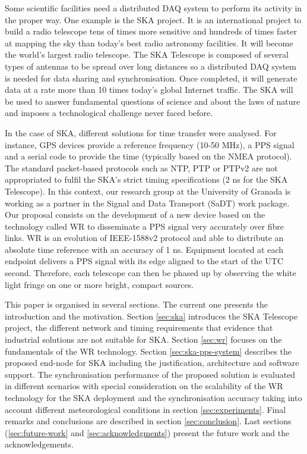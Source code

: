 Some scientific facilities need a distributed DAQ system to perform its activity in the proper way. One example is the SKA \cite{ska:project_website} project. It is an international project to build a radio telescope tens of times more sensitive and hundreds of times faster at mapping the sky than today's best radio astronomy facilities. It will become the world's largest radio telescope. The SKA Telescope is composed of several types of antennas to be spread over long distances so a distributed DAQ system is needed for data sharing and synchronisation. Once completed, it will generate data at a rate more than 10 times today’s global Internet traffic. The SKA will be used to answer fundamental questions of science and about the laws of nature and imposes a technological challenge never faced before.

In the case of SKA, different solutions for time transfer were analysed. For instance, GPS devices provide a reference frequency (10-50 MHz), a PPS signal and a serial code to provide the time (typically based on the NMEA protocol). The standard packet-based protocols such as NTP, PTP or PTPv2 are not appropriated to fulfil the SKA's strict timing specifications (2 ns for the SKA Telescope).
In this context, our research group at the University of Granada is working as a partner in the Signal and Data Transport (SaDT) \cite{ska:sadt_website} work package. Our proposal consists on the development of a new device based on the technology called WR \cite{ohwr:wr_wiki} to disseminate a PPS signal very accurately over fibre links. WR is an evolution of IEEE-1588v2 protocol and able to distribute an absolute time reference with an accuracy of 1 ns. Equipment located at each endpoint delivers a PPS signal with its edge aligned to the start of the UTC second. Therefore, each telescope can then be phased up by observing the white light fringe on one or more bright, compact sources.

This paper is organised in several sections. The current one 
presents the introduction and the motivation. Section \ref{sec:ska} introduces the SKA Telescope project, the different network and timing requirements that evidence that industrial solutions are not suitable for SKA. Section \ref{sec:wr} focuses on the fundamentals of the WR technology. Section \ref{sec:ska-pps-system} describes the proposed end-node for SKA including the justification, architecture and software support. The synchronisation performance of the proposed solution is evaluated in different scenarios with special consideration on the scalability of the WR technology for the SKA deployment and the synchronisation accuracy taking into account different meteorological conditions in section \ref{sec:experiments}. Final remarks and conclusions are described in section \ref{sec:conclusion}. Last sections (\ref{sec:future-work} and \ref{sec:acknowledgments}) present the future work and the acknowledgements.


